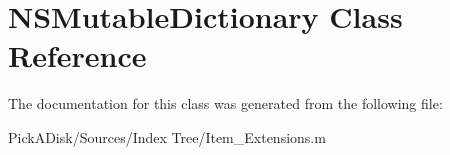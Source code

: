 \hypertarget{class_n_s_mutable_dictionary}{
\section{NSMutableDictionary Class Reference}
\label{class_n_s_mutable_dictionary}
}


The documentation for this class was generated from the following file:\begin{DoxyCompactItemize}
\item 
PickADisk/Sources/Index Tree/Item\_\-Extensions.m\end{DoxyCompactItemize}
